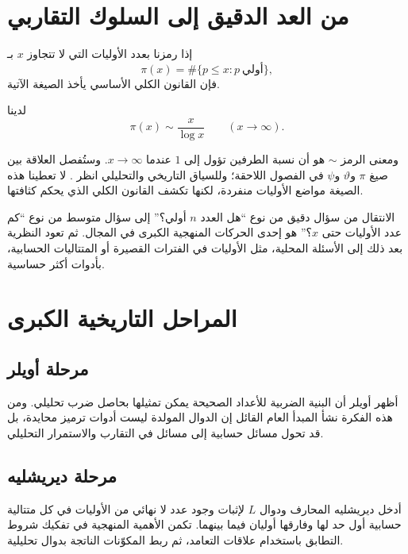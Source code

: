 \section{من العد الدقيق إلى السلوك التقاربي}

إذا رمزنا بعدد الأوليات التي لا تتجاوز \(x\) بـ
\[
\pi(x)=\#\{p\leq x:p\ \text{أولي}\},
\]
فإن القانون الكلي الأساسي يأخذ الصيغة الآتية.

\begin{theorem}
لدينا
\[
\pi(x)\sim \frac{x}{\log x}
\qquad (x\to\infty).
\]
\end{theorem}

ومعنى الرمز \(\sim\) هو أن نسبة الطرفين تؤول إلى \(1\) عندما \(x\to\infty\).
وستُفصل العلاقة بين صيغ \(\pi\) و\(\vartheta\) و\(\psi\) في الفصول
اللاحقة؛ وللسياق التاريخي والتحليلي انظر
\cite{Narkiewicz2000,Davenport2000,Newman1980}. لا تعطينا هذه الصيغة مواضع الأوليات منفردة، لكنها تكشف القانون الكلي الذي يحكم كثافتها.

الانتقال من سؤال دقيق من نوع ``هل العدد \(n\) أولي؟'' إلى سؤال متوسط من نوع ``كم عدد الأوليات حتى \(x\)؟'' هو إحدى الحركات المنهجية الكبرى في المجال. ثم تعود النظرية بعد ذلك إلى الأسئلة المحلية، مثل الأوليات في الفترات القصيرة أو المتتاليات الحسابية، بأدوات أكثر حساسية.

\section{المراحل التاريخية الكبرى}

\subsection{مرحلة أويلر}

أظهر أويلر أن البنية الضربية للأعداد الصحيحة يمكن تمثيلها بحاصل ضرب تحليلي. ومن هذه الفكرة نشأ المبدأ العام القائل إن الدوال المولدة ليست أدوات ترميز محايدة، بل قد تحول مسائل حسابية إلى مسائل في التقارب والاستمرار التحليلي.

\subsection{مرحلة ديريشليه}

أدخل ديريشليه المحارف ودوال \(L\) لإثبات وجود عدد لا نهائي من الأوليات في كل متتالية حسابية أول حد لها وفارقها أوليان فيما بينهما. تكمن الأهمية المنهجية في تفكيك شروط التطابق باستخدام علاقات التعامد، ثم ربط المكوّنات الناتجة بدوال تحليلية.

